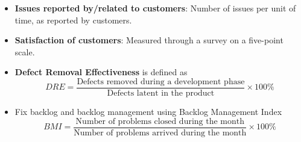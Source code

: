 \documentclass[a4paper]{article}
\begin{document}
\begin{itemize}
    \item \textbf{Issues reported by/related to customers}: Number of issues per unit of time, as reported by customers.
    \item \textbf{Satisfaction of customers}: Measured through a survey on a five-point scale.
    \item \textbf{Defect Removal Effectiveness} is defined as
    \begin{equation*}
        DRE=\frac{\text{Defects removed during a development phase}}{\text{Defects latent in the product}}\times 100\%
    \end{equation*}
    \item Fix backlog and backlog management using Backlog Management Index
    \begin{equation*}
        BMI=\frac{\text{Number of problems closed during the month}}{\text{Number of problems arrived during the month}}\times 100\%
    \end{equation*}
\end{itemize}
\end{document}
